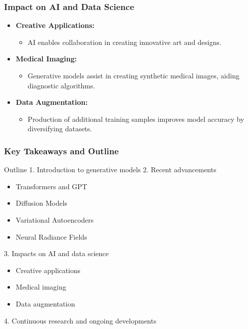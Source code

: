 \documentclass[aspectratio=169]{beamer}
\begin{document}
\begin{frame}[fragile]
    \frametitle{Impact on AI and Data Science}

    \begin{itemize}
        \item \textbf{Creative Applications:} 
            \begin{itemize}
                \item AI enables collaboration in creating innovative art and designs.
            \end{itemize}
        
        \item \textbf{Medical Imaging:} 
            \begin{itemize}
                \item Generative models assist in creating synthetic medical images, aiding diagnostic algorithms.
            \end{itemize}

        \item \textbf{Data Augmentation:} 
            \begin{itemize}
                \item Production of additional training samples improves model accuracy by diversifying datasets.
            \end{itemize}
    \end{itemize}
\end{frame}

\begin{frame}[fragile]
    \frametitle{Key Takeaways and Outline}

    \begin{block}{Outline}
        1. Introduction to generative models
        2. Recent advancements
            \begin{itemize}
                \item Transformers and GPT
                \item Diffusion Models
                \item Variational Autoencoders
                \item Neural Radiance Fields
            \end{itemize}
        3. Impacts on AI and data science
            \begin{itemize}
                \item Creative applications
                \item Medical imaging
                \item Data augmentation
            \end{itemize}
        4. Continuous research and ongoing developments
    \end{block}
\end{frame}
\end{document}
